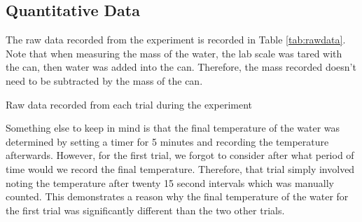 \documentclass[
	letterpaper, %
	12pt, %
]{CSUniSchoolLabReport}
\begin{document}
\subsection{Quantitative Data}

The raw data recorded from the experiment is recorded in Table \ref*{tab:rawdata}.
Note that when measuring the mass of the water, the lab scale was tared
with the can, then water was added into the can. Therefore, the mass recorded
doesn't need to be subtracted by the mass of the can.

\begin{table}[H]
  \centering
  \caption{Raw data recorded from each trial during the experiment}
  \label{tab:rawdata}
\end{table}


Something else to keep in mind is that the final temperature of the water was determined by
setting a timer for 5 minutes and recording the temperature afterwards. However,
for the first trial, we forgot to consider after what period of time would we record
the final temperature. Therefore, that trial simply involved noting the temperature after twenty
15 second intervals which was manually counted. This demonstrates a reason why
the final temperature of the water for the first trial was significantly different than
the two other trials.
\end{document}
